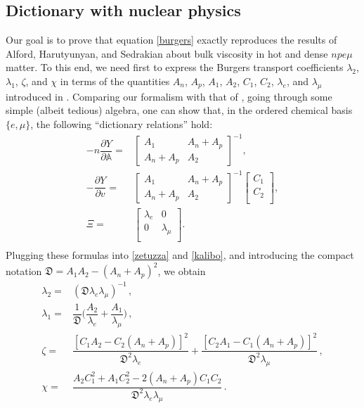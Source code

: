 \documentclass[a4paper, amsfonts, amssymb, amsmath, reprint, showkeys, nofootinbib, twoside, onecolumn,notitlepage]{revtex4-1}
\begin{document}
 

\subsection{Dictionary with nuclear physics}





Our goal is to prove that equation \eqref{burgers} exactly reproduces the results of Alford, Harutyunyan, and Sedrakian \cite{AlfordMuons2021,AlfordMuons2022} about bulk viscosity in hot and dense $npe\mu$ matter. To this end, we need first to express the Burgers transport coefficients $\lambda_2$, $\lambda_1$, $\zeta$, and $\chi$ in terms of the quantities $A_n$, $A_p$, $A_1$, $A_2$, $C_1$, $C_2$, $\lambda_e$, and $\lambda_\mu$ introduced in \cite{AlfordMuons2021,AlfordMuons2022}. Comparing our formalism with that of \cite{AlfordMuons2022}, going through some simple (albeit tedious) algebra, one can show that, in the ordered chemical basis $\{e,\mu\}$, the following ``dictionary relations'' hold:
\begin{equation}
\begin{split}
-n\dfrac{\partial Y}{\partial \mathbb{A}} ={}& 
\begin{bmatrix}
A_1 & A_n+A_p \\
A_n+A_p & A_2
\end{bmatrix}^{-1}, \\
-\dfrac{\partial Y}{\partial v} ={}& 
\begin{bmatrix}
A_1 & A_n+A_p \\
A_n+A_p & A_2
\end{bmatrix}^{-1}
\begin{bmatrix}
C_1 \\
C_2 \\
\end{bmatrix} ,\\
\Xi={}&
\begin{bmatrix}
\lambda_e & 0 \\
0 & \lambda_\mu \\
\end{bmatrix} . \\
\end{split}
\end{equation}
Plugging these formulas into \eqref{zetuzza} and \eqref{kalibo}, and introducing the compact notation $\mathfrak{D}=A_1 A_2-(A_n+A_p)^2$, we obtain
\begin{equation}\label{transpero}
\begin{split}
\lambda_2 ={}& (\mathfrak{D} \lambda_e \lambda_\mu )^{-1} \, , \\
\lambda_1 ={}& \dfrac{1}{\mathfrak{D}} \bigg( \dfrac{A_2}{\lambda_e} + \dfrac{A_1}{\lambda_\mu} \bigg) \, , \\
\zeta ={}& \dfrac{[C_1 A_2-C_2(A_n+A_p)]^2}{\mathfrak{D}^2\lambda_e} + \dfrac{[C_2 A_1-C_1(A_n+A_p)]^2}{\mathfrak{D}^2\lambda_\mu} \, , \\
\chi ={}& \dfrac{A_2 C_1^2+A_1 C_2^2-2(A_n+A_p)C_1C_2}{\mathfrak{D}^2 \lambda_e \lambda_\mu} \, . \\
\end{split}
\end{equation}
\end{document}
